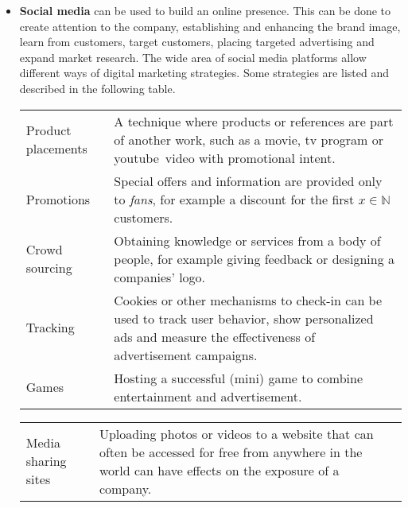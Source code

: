 \documentclass[a4]{scrartcl}
\begin{document}
	\begin{itemize}
		
		
		\item \textbf{Social media} can be used to build an online presence. This can be done to create attention to the company, establishing and enhancing the brand image, learn from customers, target customers, placing targeted advertising and expand market research. The wide area of social media platforms allow different ways of digital marketing strategies. Some strategies are listed and described in the following table.~\cite{socialmedia}
		
		\def\arraystretch{1.35}
		\begin{tabular}{l|p{10.5cm}}
			
			Product placements & A technique where products or references are part of another work, such as a movie, tv program or youtube\footnotemark \ video with promotional intent.~\cite{productplacements} \\
			
			Promotions & Special offers and information are provided only to \textit{fans}, for example a discount for the first $x \in \mathbb{N}$ customers.~\cite{socialmedia} \\
			
			Crowd sourcing & Obtaining knowledge or services from a body of people, for example giving feedback or designing a companies' logo.~\cite{socialmedia, crowdsourcing} \\ 
			
			Tracking & Cookies or other mechanisms to check-in can be used to track user behavior, show personalized ads and measure the effectiveness of advertisement campaigns.~\cite{cookies} \\
			
			Games & Hosting a successful (mini) game to combine entertainment and advertisement.~\cite{socialmedia}  \\

			
		\end{tabular}	
	
			
		\begin{tabular}{l|p{10.5cm}}
			
			Media sharing sites & Uploading photos or videos to a website that can often be
			accessed for free from anywhere in the world can have effects on the exposure of a company.~\cite{socialmedia} \\
			

\end{tabular}
\end{itemize}
\end{document}

